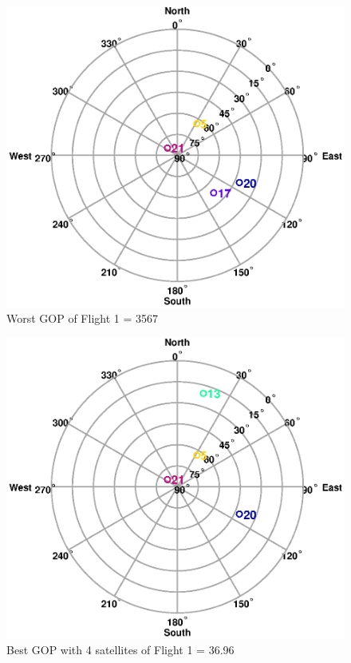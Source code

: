 \documentclass[Space3_Assign2]{subfile}
\begin{document}
\begin{figure}
\centering
\includegraphics[width=0.8\linewidth]{WorstDOP.eps}
\caption{Worst GOP of Flight 1 = 3567}
\label{fig:WorstDOP}
\end{figure}
\begin{figure}
\centering
\includegraphics[width=0.8\linewidth]{BestDOP4.eps}
\caption{Best GOP with 4 satellites of Flight 1 = 36.96}
\label{fig:BestDOP4}
\end{figure}
\end{document}
